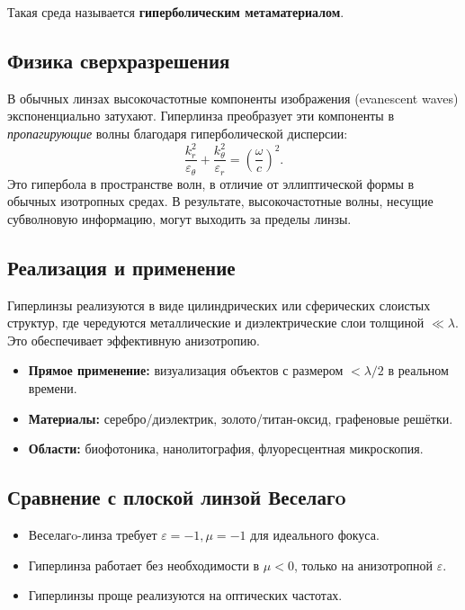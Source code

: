\documentclass[a4paper,12pt]{article}
\begin{document}
Такая среда называется \textbf{гиперболическим метаматериалом}.

\subsection*{Физика сверхразрешения}
В обычных линзах высокочастотные компоненты изображения (evanescent waves) экспоненциально затухают. Гиперлинза преобразует эти компоненты в \textit{пропагирующие} волны благодаря гиперболической дисперсии:
\begin{equation}
    \frac{k_r^2}{\varepsilon_\theta} + \frac{k_\theta^2}{\varepsilon_r} = \left(\frac{\omega}{c}\right)^2.
\end{equation}
Это гипербола в пространстве волн, в отличие от эллиптической формы в обычных изотропных средах. В результате, высокочастотные волны, несущие субволновую информацию, могут выходить за пределы линзы.

\subsection*{Реализация и применение}
Гиперлинзы реализуются в виде цилиндрических или сферических слоистых структур, где чередуются металлические и диэлектрические слои толщиной $\ll \lambda$. Это обеспечивает эффективную анизотропию.

\begin{itemize}
    \item \textbf{Прямое применение:} визуализация объектов с размером $< \lambda/2$ в реальном времени.
    \item \textbf{Материалы:} серебро/диэлектрик, золото/титан-оксид, графеновые решётки.
    \item \textbf{Области:} биофотоника, нанолитография, флуоресцентная микроскопия.
\end{itemize}

\subsection*{Сравнение с плоской линзой Веселагo}
\begin{itemize}
    \item Веселагo-линза требует $\varepsilon = -1, \mu = -1$ для идеального фокуса.
    \item Гиперлинза работает без необходимости в $\mu < 0$, только на анизотропной $\varepsilon$.
    \item Гиперлинзы проще реализуются на оптических частотах.
\end{itemize}
\end{document}
